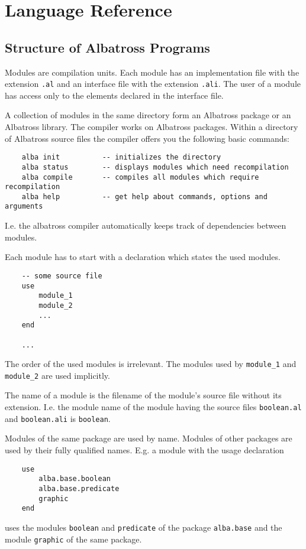 \chapter{Language Reference}

\section{Structure of Albatross Programs}

Modules are compilation units. Each module has an implementation file with the
extension \lstinline!.al! and an interface file with the extension
\lstinline!.ali!. The user of a module has access only to the elements
declared in the interface file.

A collection of modules in the same directory form an Albatross package or an
Albatross library. The compiler works on Albatross packages. Within a
directory of Albatross source files the compiler offers you the following
basic commands:

\begin{lstlisting}
    alba init          -- initializes the directory
    alba status        -- displays modules which need recompilation
    alba compile       -- compiles all modules which require recompilation
    alba help          -- get help about commands, options and arguments
\end{lstlisting}
  
I.e. the albatross compiler automatically keeps track of dependencies between
modules.

Each module has to start with a declaration which states the used modules.

\begin{lstlisting}
    -- some source file
    use
        module_1
        module_2
        ...
    end
    
    ...
\end{lstlisting}

The order of the used modules is irrelevant. The modules used by \lstinline!module_1!
and \lstinline!module_2! are used implicitly.

The name of a module is the filename of the module's source file without its
extension. I.e. the module name of the module having the source files
\lstinline!boolean.al! and \lstinline!boolean.ali! is \lstinline!boolean!.

Modules of the same package are used by name. Modules of other packages are
used by their fully qualified names. E.g. a module with the usage declaration
\begin{lstlisting}
    use
        alba.base.boolean
        alba.base.predicate
        graphic
    end
\end{lstlisting}
uses the modules \lstinline!boolean! and \lstinline!predicate! of the package
\lstinline!alba.base! and the module \lstinline!graphic! of the same package.

